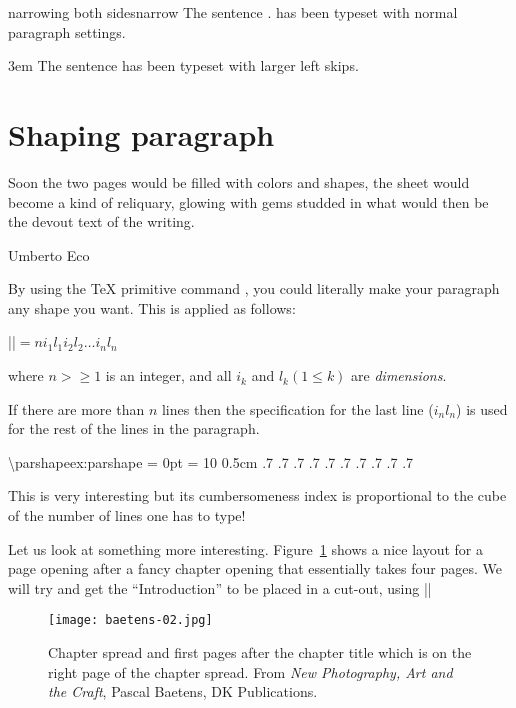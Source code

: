 \begin{texexample}{narrowing both sides}{narrow}
\begingroup
The sentence \fox. has been typeset with normal paragraph settings.

\parindent3em
\narrower \narrower\small 
The sentence \fox has been typeset with larger left skips.
\medskip
\endgroup
\end{texexample}

\section{Shaping paragraph}
\label{sec:shapingpar}

\epigraph{Soon the two pages would be filled with colors and shapes, the sheet would become a kind of
reliquary, glowing with gems studded in what would then be the devout text of the writing.}{Umberto Eco}

By using the TeX primitive command , you could literally make your paragraph any shape you want.
This is applied as follows:

|\parshape|$=n i_1l_1 i_2 l_2 \ldots i_n l_n$

where $n>\geq1$ is an integer, and all $i_k$ and $l_k(1\leq k)$ are \textit{dimensions}. 

If there are more than $n$ lines then the specification
for the last line ($i_n l_n$) is used for the rest of the
lines in the paragraph.


\begin{texexample}{\textbackslash parshape}{ex:parshape}
\parindent = 0pt
\parshape = 10
   0.5cm .7\linewidth %
   0.6cm .7\linewidth %
   0.7cm .7\linewidth %
   0.8cm .7\linewidth %
   0.9cm .7\linewidth %
   1.0cm .7\linewidth %
   1.1cm .7\linewidth %
   1.2cm .7\linewidth %
   1.3cm .7\linewidth %
   1.4cm .7\linewidth %
\onepar   
\end{texexample}

This is very interesting but its cumbersomeness index is proportional to the cube of the number of lines one has to type! 

Let us look at something more interesting. Figure~\ref{fig:photospread2} shows a nice layout for a page opening after a fancy chapter opening that essentially takes four pages. We will try and get the ``Introduction'' to be placed in a cut-out, using |\parshape|
\begin{figure}[htbp]
\parindent=0pt
\texttt{[image: baetens-02.jpg]}\par
\caption{Chapter spread and first pages after the chapter title which is on the right page of the chapter spread. From \textit{New Photography, Art and the Craft}, Pascal Baetens, DK Publications. }
\label{fig:photospread2}
\end{figure}

